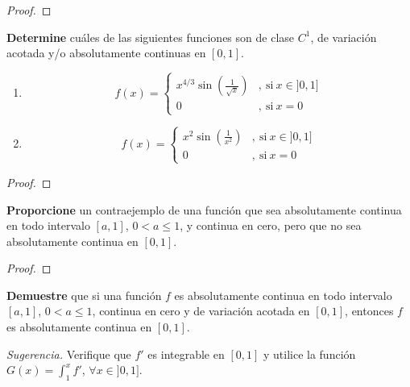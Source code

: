 \documentclass[12pt]{report}
\theoremstyle{largebreak}
\begin{document}
    \begin{proof}
        
    \end{proof}

    \begin{excer}
        \textbf{Determine} cuáles de las siguientes funciones son de clase $C^1$, de variación acotada y/o absolutamente continuas en $[0,1]$.
        \begin{enumerate}
            \item \begin{equation*}
                f(x) = 
                \left \{
                    \begin{aligned}
                    x^{4/3}\sin\left(\frac{1}{\sqrt{x}}\right) &,\ \text{si} \ x \in ]0,1]\\
                    0 &,\ \text{si} \ x=0
                    \end{aligned}
                \right .
            \end{equation*}
            \item \begin{equation*}
                f(x) = 
                \left \{
                    \begin{aligned}
                    x^2\sin\left(\frac{1}{x^2}\right) &,\ \text{si} \ x \in ]0,1]\\
                    0 &,\ \text{si} \ x=0
                    \end{aligned}
                \right .
            \end{equation*}
        \end{enumerate}
    \end{excer}

    \begin{proof}
        
    \end{proof}

    \begin{excer}
        \textbf{Proporcione} un contraejemplo de una función que sea absolutamente continua en todo intervalo $[a,1]$, $0< a\leq 1$, y continua en cero, pero que no sea absolutamente continua en $[0,1]$.
    \end{excer}

    \begin{proof}
        
    \end{proof}

    \begin{excer}
        \textbf{Demuestre} que si una función $f$ es absolutamente continua en todo intervalo $[a,1]$, $0< a\leq 1$, continua en cero y de variación acotada en $[0,1]$, entonces $f$ es absolutamente continua en $[0,1]$.
        
        \textit{Sugerencia.} Verifique que $f'$ es integrable en $[0,1]$ y utilice la función $G(x)=\int_{1}^{x}f'$, $\forall x\in]0,1]$.
    \end{excer}
\end{document}

